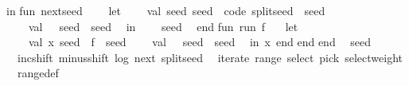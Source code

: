 \begin{isabellebody}
\isanewline
in\isanewline
\isanewline
fun\ next{\isacharunderscore}{\kern0pt}seed\ {\isacharparenleft}{\kern0pt}{\isacharparenright}{\kern0pt}\ {\isacharequal}{\kern0pt}\isanewline
\ \ let\isanewline
\ \ \ \ val\ {\isacharparenleft}{\kern0pt}seed{}{\isacharcomma}{\kern0pt}\ seed{\isacharprime}{\kern0pt}{\isacharparenright}{\kern0pt}\ {\isacharequal}{\kern0pt}\ {\isacharat}{\kern0pt}{\isacharbraceleft}{\kern0pt}code\ split{\isacharunderscore}{\kern0pt}seed{\isacharbraceright}{\kern0pt}\ {\isacharparenleft}{\kern0pt}{\isacharbang}{\kern0pt}\ seed{\isacharparenright}{\kern0pt}\isanewline
\ \ \ \ val\ {\isacharunderscore}{\kern0pt}\ {\isacharequal}{\kern0pt}\ seed\ {\isacharcolon}{\kern0pt}{\isacharequal}{\kern0pt}\ seed{\isacharprime}{\kern0pt}\isanewline
\ \ in\isanewline
\ \ \ \ seed{}\isanewline
\ \ end\isanewline
\isanewline
fun\ run\ f\ {\isacharequal}{\kern0pt}\isanewline
\ \ let\isanewline
\ \ \ \ val\ {\isacharparenleft}{\kern0pt}x{\isacharcomma}{\kern0pt}\ seed{\isacharprime}{\kern0pt}{\isacharparenright}{\kern0pt}\ {\isacharequal}{\kern0pt}\ f\ {\isacharparenleft}{\kern0pt}{\isacharbang}{\kern0pt}\ seed{\isacharparenright}{\kern0pt}{\isacharsemicolon}{\kern0pt}\isanewline
\ \ \ \ val\ {\isacharunderscore}{\kern0pt}\ {\isacharequal}{\kern0pt}\ seed\ {\isacharcolon}{\kern0pt}{\isacharequal}{\kern0pt}\ seed{\isacharprime}{\kern0pt}\isanewline
\ \ in\ x\ end{\isacharsemicolon}{\kern0pt}\isanewline
\isanewline
end{\isacharsemicolon}{\kern0pt}\isanewline
\isanewline
end{\isacharsemicolon}{\kern0pt}\isanewline
{\isacartoucheclose}%
\endisatagML
{\isafoldML}%
%
\isadelimML
\isanewline
%
\endisadelimML
\isanewline
{}\isamarkupfalse%
\ {\isacharparenleft}{\kern0pt}\ seed\isanewline
{}\isamarkupfalse%
\ {\isacharparenleft}{\kern0pt}\ inc{\isacharunderscore}{\kern0pt}shift\ minus{\isacharunderscore}{\kern0pt}shift\ log\ {\isachardoublequoteopen}next{\isachardoublequoteclose}\ split{\isacharunderscore}{\kern0pt}seed\isanewline
\ \ iterate\ range\ select\ pick\ select{\isacharunderscore}{\kern0pt}weight\isanewline
{}\isamarkupfalse%
\ {\isacharparenleft}{\kern0pt}\ range{\isacharunderscore}{\kern0pt}def\isanewline
%
\isadelimtheory
\isanewline
%
\endisadelimtheory
%
\isatagtheory
{}\isamarkupfalse%
%
\endisatagtheory
{\isafoldtheory}%
%
\isadelimtheory
%
\endisadelimtheory
%
\end{isabellebody}%
